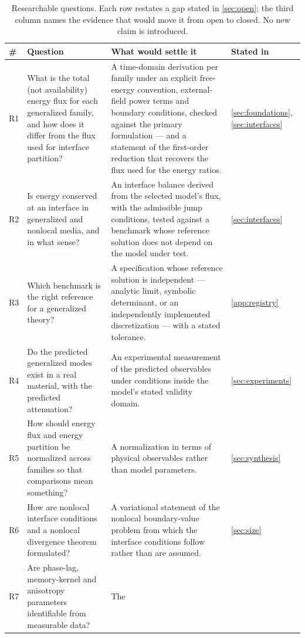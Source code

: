 \begin{table}[H]\centering\small
\caption{Researchable questions. Each row restates a gap stated in \cref{sec:open}; the third column
names the evidence that would move it from open to closed. No new claim is introduced.}
\label{tab:research-questions}
\begin{tabularx}{\textwidth}{@{}p{0.5cm}Y Y p{1.75cm}@{}}
\toprule
\textbf{\#} & \textbf{Question} & \textbf{What would settle it} & \textbf{Stated in} \\
\midrule
R1 & What is the total (not availability) energy flux for each generalized family, and how does it
  differ from the flux used for interface partition? & A time-domain derivation per family under an
  explicit free-energy convention, external-field power terms and boundary conditions, checked against
  the primary formulation --- and a statement of the first-order reduction that recovers the flux used
  for the energy ratios. & \cref{sec:foundations}, \cref{sec:interfaces} \\
R2 & Is energy conserved at an interface in generalized and nonlocal media, and in what sense? & An
  interface balance derived from the selected model's flux, with the admissible jump conditions, tested
  against a benchmark whose reference solution does not depend on the model under test. &
  \cref{sec:interfaces} \\
R3 & Which benchmark is the right reference for a generalized theory? & A specification whose reference
  solution is independent --- analytic limit, symbolic determinant, or an independently implemented
  discretization --- with a stated tolerance. & \cref{app:registry} \\
R4 & Do the predicted generalized modes exist in a real material, with the predicted attenuation? & An
  experimental measurement of the predicted observables under conditions inside the model's stated
  validity domain. & \cref{sec:experiments} \\
R5 & How should energy flux and energy partition be normalized across families so that comparisons mean
  something? & A normalization in terms of physical observables rather than model parameters. &
  \cref{sec:synthesis} \\
R6 & How are nonlocal interface conditions and a nonlocal divergence theorem formulated? & A variational
  statement of the nonlocal boundary-value problem from which the interface conditions follow rather than
  are assumed. & \cref{sec:size} \\
R7 & Are phase-lag, memory-kernel and anisotropy parameters identifiable from measurable data? & The

\end{tabularx}
\end{table}
